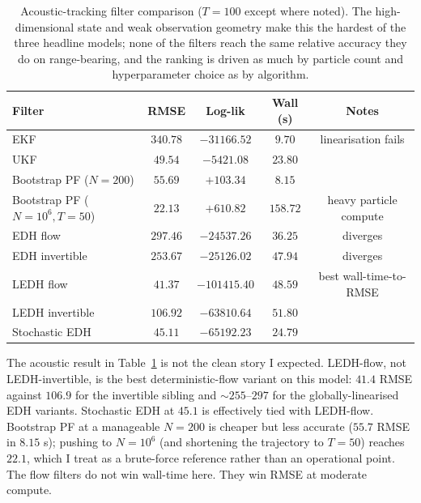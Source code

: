 \documentclass{article}
\begin{document}
\begin{table}[H]
\centering
\footnotesize
\caption{Acoustic-tracking filter comparison ($T = 100$ except where noted). The high-dimensional state and weak observation geometry make this the hardest of the three headline models; none of the filters reach the same relative accuracy they do on range-bearing, and the ranking is driven as much by particle count and hyperparameter choice as by algorithm.}
\label{tab:edh-acoustic}
\begin{tabular}{lcccc}
\toprule
Filter & RMSE & Log-lik & Wall (s) & Notes \\
\midrule
EKF                          & $340.78$ & $-31166.52$ & $9.70$   & linearisation fails \\
UKF                          & $49.54$  & $-5421.08$  & $23.80$  &  \\
Bootstrap PF ($N=200$)       & $55.69$  & $+103.34$   & $8.15$   &  \\
Bootstrap PF ($N = 10^6, T=50$) & $22.13$ & $+610.82$  & $158.72$ & heavy particle compute \\
EDH flow                     & $297.46$ & $-24537.26$ & $36.25$  & diverges \\
EDH invertible               & $253.67$ & $-25126.02$ & $47.94$  & diverges \\
LEDH flow                    & $41.37$  & $-101415.40$& $48.59$  & best wall-time-to-RMSE \\
LEDH invertible              & $106.92$ & $-63810.64$ & $51.80$  &  \\
Stochastic EDH               & $45.11$  & $-65192.23$ & $24.79$  &  \\
\bottomrule
\end{tabular}
\end{table}

The acoustic result in Table~\ref{tab:edh-acoustic} is not the clean story I expected. LEDH-flow, not LEDH-invertible, is the best deterministic-flow variant on this model: $41.4$ RMSE against $106.9$ for the invertible sibling and ${\sim}255$--$297$ for the globally-linearised EDH variants. Stochastic EDH at $45.1$ is effectively tied with LEDH-flow. Bootstrap PF at a manageable $N = 200$ is cheaper but less accurate ($55.7$ RMSE in $8.15$ s); pushing to $N = 10^6$ (and shortening the trajectory to $T=50$) reaches $22.1$, which I treat as a brute-force reference rather than an operational point. The flow filters do not win wall-time here. They win RMSE at moderate compute.
\end{document}
